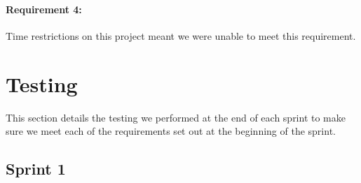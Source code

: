 \documentclass[a4paper, oneside, 11pt]{report}
\begin{document}
\subsubsection{Requirement 4:}
Time restrictions on this project meant we were unable to meet this requirement.

\chapter{Testing}

This section details the testing we performed at the end of each sprint to make sure we meet each of the requirements set out at the beginning of the sprint.

\section{Sprint 1}
\end{document}
